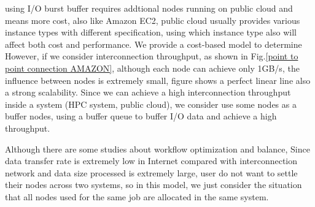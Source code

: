 

using I/O burst buffer requires addtional nodes running on public cloud and means more cost, also like Amazon EC2, public cloud usually provides various instance types with different specification, using which instance type also will affect both cost and performance.
We provide a cost-based model to determine 
However, if we consider interconnection throughput, as shown in Fig.\ref{point to point connection AMAZON}, although each node can achieve only 1GB/s, the influence between nodes is extremely small, figure shows a perfect linear line also a strong scalability.
Since we can achieve a high interconnection throughput inside a system (HPC system, public cloud), we consider use some nodes as a buffer nodes, using a buffer queue to buffer I/O data and achieve a high throughput.

Although there are some studies about workflow optimization and  balance\cite{Workload}, Since data transfer rate is extremely low in Internet compared with interconnection network and data size processed is extremely large, user do not want to settle their nodes across two systems, so in this model, we just consider the situation that all nodes used for the same job are allocated in the same system.
